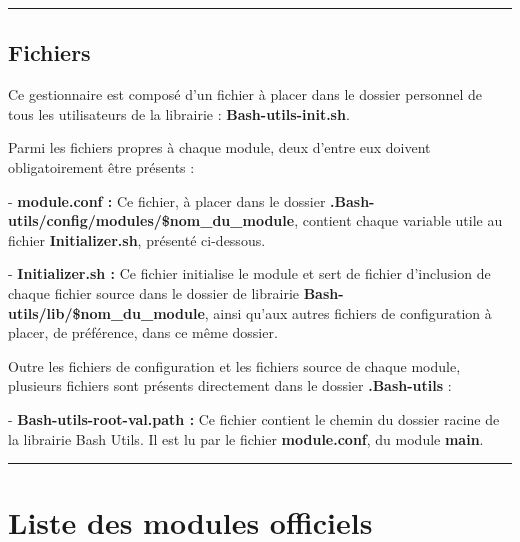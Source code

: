 \documentclass[a4paper,10pt]{article}
\begin{document}
  \color{green}\par\noindent\rule{\textwidth}{0.4pt}\color{white}

  \color{green}
  \subsection{Fichiers}\color{white}
  Ce gestionnaire est composé d'un fichier à placer dans le dossier personnel de tous les utilisateurs de la librairie :  \textbf{\color{lime}Bash-utils-init.sh\color{white}}.\linebreak

  Parmi les fichiers propres à chaque module, deux d'entre eux doivent obligatoirement être présents :\linebreak

  - \textbf{\color{lime}module.conf\color{white} :} Ce fichier, à placer dans le dossier \textbf{\color{lime}.Bash-utils/config/modules/\$nom\_du\_module\color{white}}, contient chaque variable utile au fichier \textbf{\color{lime}Initializer.sh\color{white}}, présenté ci-dessous.\linebreak

  - \textbf{\color{lime}Initializer.sh\color{white} :} Ce fichier initialise le module et sert de fichier d'inclusion de chaque fichier source dans le dossier de librairie \textbf{\color{lime}Bash-utils/lib/\$nom\_du\_module\color{white}}, ainsi qu'aux autres fichiers de configuration à placer, de préférence, dans ce même dossier.\linebreak

  Outre les fichiers de configuration et les fichiers source de chaque module, plusieurs fichiers sont présents directement dans le dossier \textbf{\color{lime}.Bash-utils\color{white}} :\linebreak

  - \textbf{\color{lime}Bash-utils-root-val.path\color{white} :} Ce fichier contient le chemin du dossier racine de la librairie Bash Utils. Il est lu par le fichier \textbf{\color{lime}module.conf\color{white}}, du module \color{lime}\textbf{main\color{white}}.\\[1\baselineskip]



  \color{red}\par\noindent\rule{\textwidth}{0.4pt}\color{white}

 \color{red}
 \section{Liste des modules officiels}\color{white}
\end{document}
